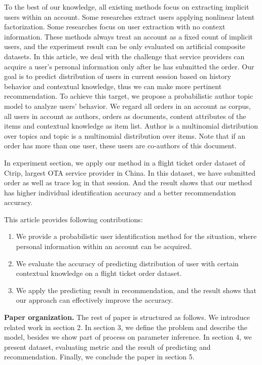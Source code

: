 \documentclass{sig-alternate-05-2015}
\begin{document}
To the best of our knowledge, all existing methods focus on extracting implicit users within an account. Some researches\cite{kabbur:nlmf}\cite{jason:embedding} extract users applying nonlinear latent factorization. Some researches\cite{koen:top-n}\cite{yutaka:modeling} focus on user extraction with no context information. These methods always treat an account as a fixed count of implicit users, and the experiment result can be only evaluated on artificial composite datasets. In this article, we deal with the challenge that service providers can acquire a user's personal information only after he has submitted the order. Our goal is to predict distribution of users in current session based on history behavior and contextual knowledge, thus we can make more pertinent recommendation. To achieve this target, we propose a probabilistic author topic model to analyze users' behavior. We regard all orders in an account as corpus, all users in account as authors, orders as documents, content attributes of the items and contextual knowledge as item list. Author is a multinomial distribution over topics and topic is a multinomial distribution over items. Note that if an order has more than one user, these users are co-authors of this document.\par
In experiment section, we apply our method in a flight ticket order dataset of Ctrip, largest OTA service provider in China. In this dataset, we have submitted order as well as trace log in that session. And the result shows that our method has higher individual identification accuracy and a better recommendation accuracy.\par
This article provides following contributions:\\
\begin{enumerate}
\item We provide a probabilistic user identification method for the situation, where personal information within an account can be acquired.
\item We evaluate the accuracy of predicting distribution of user with certain contextual knowledge on a flight ticket order dataset.
\item We apply the predicting result in recommendation, and the result shows that our approach can effectively improve the accuracy.
\end{enumerate}
\textbf{Paper organization.} The rest of paper is structured as follows. We introduce related work in section 2. In section 3, we define the problem and describe the model, besides we show part of process on parameter inference. In section 4, we present dataset, evaluating metric and the result of predicting and recommendation. Finally, we conclude the paper in section 5.
\end{document}
